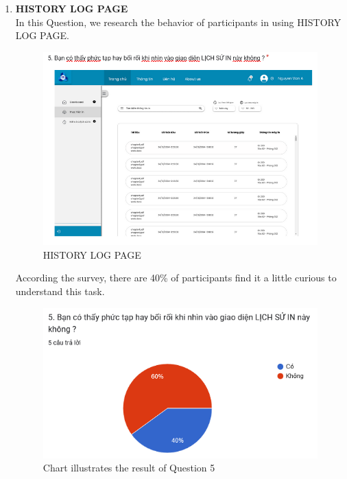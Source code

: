 \begin{enumerate}
    \item \textbf{HISTORY LOG PAGE} \\
    In this Question, we research the behavior of participants in using HISTORY LOG PAGE.
\begin{figure}[!h]
    \centering
    \includegraphics[width=0.8\linewidth]{images/image_uasbility/Q5_Stu.png}
    \caption{HISTORY LOG PAGE}
    \label{fig:HISTORY LOG PAGE}
\end{figure}
\newpage
According the survey, there are 40\% of participants find it a little curious to understand this task.
\begin{figure}[!h]
    \centering
    \includegraphics[width=0.8\linewidth]{images/image_uasbility/A5_Stu.png}
    \caption{Chart illustrates the result of Question 5}
    \label{fig:Chart illustrates the result of Question 5}
\end{figure}
\end{enumerate}

